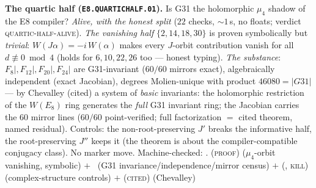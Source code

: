 \documentclass[11pt,a4paper]{article}
\theoremstyle{definition}
\begin{document}
\par\smallskip\noindent\textbf{The quartic half
(\texttt{E8.QUARTICHALF.01}).}
Is G31 the holomorphic $\mu_4$ shadow of the E8 compiler?
\emph{Alive, with the honest split} ($22$ checks, ${\sim}1$\,s, no
floats; verdict \textsc{quartic-half-alive}).  \emph{The vanishing
half} $\{2,14,18,30\}$ is proven symbolically but \emph{trivial}:
$W(J\alpha)=-i\,W(\alpha)$ makes every $J$-orbit contribution vanish
for all $d\not\equiv0\bmod4$ (holds for $6,10,22,26$ too --- honest
typing).  \emph{The substance}: $F_8|,F_{12}|,F_{20}|,F_{24}|$ are
G31-invariant ($60/60$ mirrors exact), algebraically independent
(exact Jacobian), degrees Molien-unique with product
$46080=|G31|$ --- by Chevalley (cited) a system of \emph{basic}
invariants: the holomorphic restriction of the $W(E_8)$ ring
generates the \emph{full} G31 invariant ring; the Jacobian carries
the $60$ mirror lines ($60/60$ point-verified; full factorization
$=$ cited theorem, named residual).  Controls: the non-root-preserving
$J'$ breaks the informative half, the root-preserving $J''$ keeps it
(the theorem is about the compiler-compatible conjugacy class).  No
marker move.
Machine-checked: .
(\textsc{proof}) ($\mu_4$-orbit vanishing, symbolic) $+$ \mE\ (G31
invariance/independence/mirror census) $+$ (\mE, \textsc{kill})
(complex-structure controls) $+$ (\textsc{cited}) (Chevalley)
\par\smallskip
\end{document}
